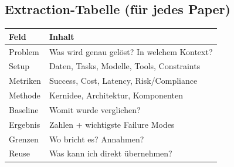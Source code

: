 \subsection{Extraction-Tabelle (für jedes Paper)}
\begin{center}
\begin{tabular}{@{}p{3.2cm}p{11.4cm}@{}}
\toprule
\textbf{Feld} & \textbf{Inhalt} \\
\midrule
Problem & Was wird genau gelöst? In welchem Kontext? \\
Setup & Daten, Tasks, Modelle, Tools, Constraints \\
Metriken & Success, Cost, Latency, Risk/Compliance \\
Methode & Kernidee, Architektur, Komponenten \\
Baseline & Womit wurde verglichen? \\
Ergebnis & Zahlen + wichtigste Failure Modes \\
Grenzen & Wo bricht es? Annahmen? \\
Reuse & Was kann ich direkt übernehmen? \\
\bottomrule
\end{tabular}
\end{center}
